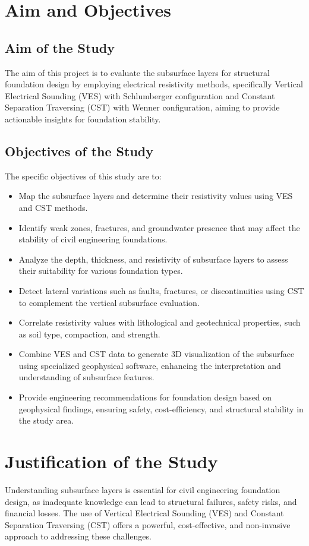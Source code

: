 \documentclass[12pt,a4paper]{report}
\begin{document}
\section{Aim and Objectives}
\subsection{Aim of the Study}
The aim of this project is to evaluate the subsurface layers for structural foundation design by employing electrical resistivity methods, specifically Vertical Electrical Sounding (VES) with Schlumberger configuration and Constant Separation Traversing (CST) with Wenner configuration, aiming to provide actionable insights for foundation stability.

\subsection{Objectives of the Study}
The specific objectives of this study are to:
\begin{itemize}
    \item Map the subsurface layers and determine their resistivity values using VES and CST methods.
    \item Identify weak zones, fractures, and groundwater presence that may affect the stability of civil engineering foundations.
    \item Analyze the depth, thickness, and resistivity of subsurface layers to assess their suitability for various foundation types.
    \item Detect lateral variations such as faults, fractures, or discontinuities using CST to complement the vertical subsurface evaluation.
    \item Correlate resistivity values with lithological and geotechnical properties, such as soil type, compaction, and strength.
    \item Combine VES and CST data to generate 3D visualization of the subsurface using specialized geophysical software, enhancing the interpretation and understanding of subsurface features.
    \item Provide engineering recommendations for foundation design based on geophysical findings, ensuring safety, cost-efficiency, and structural stability in the study area.
\end{itemize}

\section{Justification of the Study}
Understanding subsurface layers is essential for civil engineering foundation design, as inadequate knowledge can lead to structural failures, safety risks, and financial losses. The use of Vertical Electrical Sounding (VES) and Constant Separation Traversing (CST) offers a powerful, cost-effective, and non-invasive approach to addressing these challenges.
\end{document}
